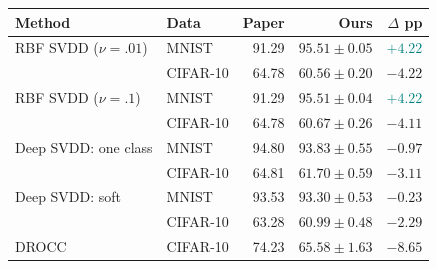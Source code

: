 \begin{tabular}{@{}llrrr@{}}
\toprule
\textbf{Method} & \textbf{Data} & \textbf{Paper} & \textbf{Ours} & \textbf{$\Delta$ pp}\\
\midrule
RBF SVDD ($\nu=.01$) & MNIST & 91.29 & $95.51\pm0.05$ & \textcolor{teal}{$+4.22$}\\
 & CIFAR-10 & 64.78 & $60.56\pm0.20$ & \textcolor{resultred}{$-4.22$}\\
RBF SVDD ($\nu=.1$) & MNIST & 91.29 & $95.51\pm0.04$ & \textcolor{teal}{$+4.22$}\\
 & CIFAR-10 & 64.78 & $60.67\pm0.26$ & \textcolor{resultred}{$-4.11$}\\
Deep SVDD: one class & MNIST & 94.80 & $93.83\pm0.55$ & \textcolor{resultred}{$-0.97$}\\
 & CIFAR-10 & 64.81 & $61.70\pm0.59$ & \textcolor{resultred}{$-3.11$}\\
Deep SVDD: soft & MNIST & 93.53 & $93.30\pm0.53$ & \textcolor{resultred}{$-0.23$}\\
 & CIFAR-10 & 63.28 & $60.99\pm0.48$ & \textcolor{resultred}{$-2.29$}\\
DROCC & CIFAR-10 & 74.23 & $65.58\pm1.63$ & \textcolor{resultred}{$-8.65$}\\
\bottomrule
\end{tabular}
